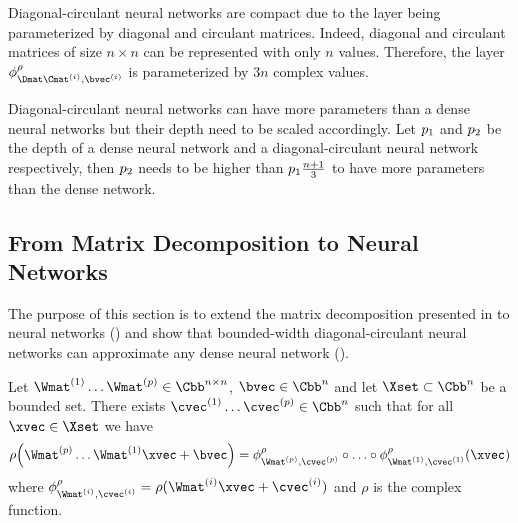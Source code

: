 Diagonal-circulant neural networks are compact due to the layer being parameterized by diagonal and circulant matrices.
Indeed, diagonal and circulant matrices of size  $n \times n$ can be represented with only $n$ values.
Therefore, the layer $\layer^{\act}_{\Dmat\Cmat^{(i)},\bvec^{(i)}}$ is parameterized by $3n$ complex values.

Diagonal-circulant neural networks can have more parameters than a dense neural networks but their depth need to be scaled accordingly.
Let $p_1$ and $p_2$ be the depth of a dense neural network and a diagonal-circulant neural network respectively, then $p_2$ needs to be higher than $p_1 \frac{n+1}{3}$ to have more parameters than the dense network. 




\subsection{From Matrix Decomposition to Neural Networks}
\label{subsection:ch4-from_matrix_decomposition_to_neural_networks}


The purpose of this section is to extend the matrix decomposition presented in  to neural networks () and show that bounded-width diagonal-circulant neural networks can approximate any dense neural network ().


\begin{lemma} \label{lemma:ch4-product_of_mat_to_DNN}
  Let $\Wmat^{(1)} \ldots \Wmat^{(\depth)} \in \Cbb^{n\times n}$, $\bvec \in \Cbb^n$ and let $\Xset \subset \Cbb^n$ be a bounded set.
  There exists $\cvec^{(1)} \ldots \cvec^{(\depth)} \in \Cbb^n$ such that for all $\xvec \in \Xset$ we have 
  \begin{equation}
    \rho\left(\Wmat^{(\depth)} \ldots \Wmat^{(1)} \xvec + \bvec \right) = \layer^\rho_{\Wmat^{(\depth)},\cvec^{(\depth)}} \circ \ldots \circ \layer^\rho_{\Wmat^{(1)},\cvec^{(1)}}(\xvec)
  \end{equation}
  where $\layer^\rho_{\Wmat^{(i)},\cvec^{(i)}} = \rho( \Wmat^{(i)} \xvec + \cvec^{(i)} )$ and $\rho$ is the complex \relu function.
\end{lemma}

